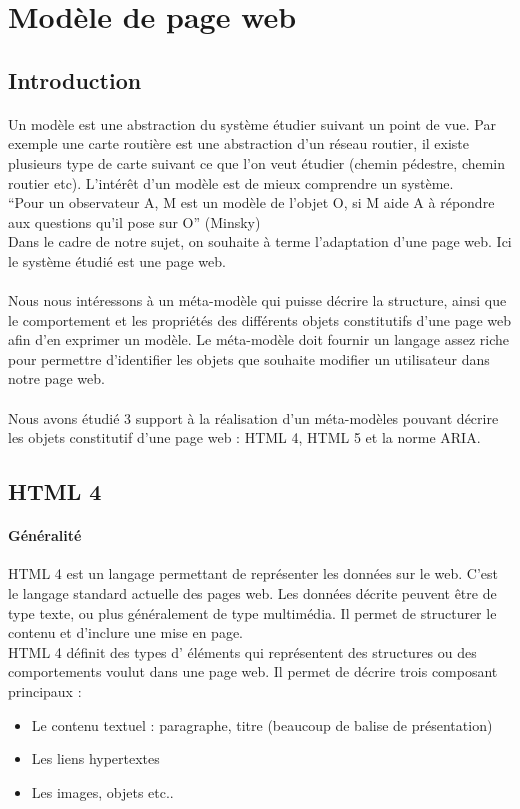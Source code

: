 \section{Modèle de page web}
\subsection{Introduction}
\paragraph{}
Un modèle est une abstraction du système étudier suivant un point de vue. Par exemple une carte routière est une abstraction d'un réseau routier, il existe plusieurs type de carte suivant ce que l'on veut étudier (chemin pédestre, chemin routier etc). L’intérêt d'un modèle est de mieux comprendre un système.\\
\enquote{Pour un observateur A, M est un modèle de l'objet O, si M aide A à répondre aux questions qu'il pose sur O} (Minsky)\\
Dans le cadre de notre sujet, on souhaite à terme l’adaptation d'une page web. Ici le système étudié est une page web.
\paragraph{}
Nous nous intéressons à un méta-modèle qui puisse décrire la structure, ainsi que le comportement et les propriétés des différents objets constitutifs d'une page web afin d'en exprimer un modèle.
Le méta-modèle doit fournir un langage assez riche pour permettre d'identifier les objets que souhaite modifier un utilisateur dans notre page web. 
\paragraph{} 
Nous avons étudié 3 support à la réalisation d'un méta-modèles pouvant décrire les objets constitutif d'une page web : HTML 4, HTML 5 et la norme ARIA. 
\subsection{HTML 4}
\paragraph{Généralité}
HTML 4 est un langage permettant de représenter les données sur le web. C'est le langage standard actuelle des pages web. Les données décrite peuvent être de type texte, ou plus généralement de type multimédia. Il permet de structurer le contenu et d'inclure une mise en page.
\\
HTML 4 définit des types d' éléments qui représentent des structures ou des comportements voulut dans une page web. Il permet de décrire trois composant principaux :
\begin{itemize}
\item Le contenu textuel : paragraphe, titre (beaucoup de balise de présentation)
\item Les liens hypertextes
\item Les images, objets etc..
\end{itemize}

